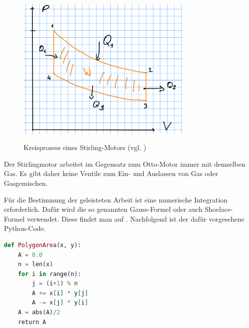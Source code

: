 \documentclass{article}
\begin{document}
\begin{figure}[H]
\caption{Kreisprozess eines Stirling-Motors (vgl. \cite{demtr1})}
\includegraphics[height=7cm]{pV.png}
\label{fig:pV_skizze}
\end{figure}


Der Stirlingmotor arbeitet im Gegensatz zum Otto-Motor immer mit demselben Gas. Es gibt daher keine Ventile zum Ein- und Auslassen von Gas oder Gasgemischen.


Für die Bestimmung der geleisteten Arbeit ist eine numerische Integration erforderlich. Dafür wird die so genannten Gauss-Formel oder auch Shoelace-Formel verwendet. Diese findet man auf \cite{polygon}. Nachfolgend ist der dafür vorgesehene Python-Code.






\begin{lstlisting}[language=elixir, caption={Gauss-Formel zur Berechnung der Fläche von Polygonen.},captionpos=b, label=lst:test]
def PolygonArea(x, y):
    A = 0.0
    n = len(x)
    for i in range(n):
        j = (i+1) % n
        A += x[i] * y[j]
        A -= x[j] * y[i]
    A = abs(A)/2
    return A
\end{lstlisting}
\end{document}
